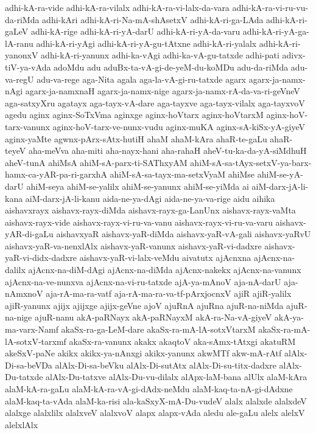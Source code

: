 {adhi-kA-ra-vide
adhi-kA-ra-vilalx
adhi-kA-ra-vi-lalx-da-vara
adhi-kA-ra-vi-ru-vu-da-riMda
adhi-kAri
adhi-kA-ri-Na-mA-shAsetxV
adhi-kA-ri-ga-LAda
adhi-kA-ri-gaLeV
adhi-kA-rige
adhi-kA-ri-yA-darU
adhi-kA-ri-yA-da-varu
adhi-kA-ri-yA-ga-lA-ranu
adhi-kA-ri-yAgi
adhi-kA-ri-yA-gu-tAtxne
adhi-kA-ri-yalalx
adhi-kA-ri-yanonxV
adhi-kA-ri-yanunx
adhi-ka-vAgi
adhi-ka-vA-gu-tatxde
adhi-pati
adivx-tiV-ya-vAda
adoMdu
adu
aduBx-ta-vA-gi-de-yeM-du-koMDu
adu-da-riMda
adu-va-regU
adu-va-rege
aga-Nita
agala
aga-la-vA-gi-ru-tatxde
agarx
agarx-ja-namx-nAgi
agarx-ja-namxnaH
agarx-ja-namx-nige
agarx-ja-namx-rA-da-va-ri-geVneV
aga-satxyXru
agatayx
aga-tayx-vA-dare
aga-tayxve
aga-tayx-vilalx
aga-tayxvoV
agedu
aginx
aginx-SoTxVma
aginxge
aginx-hoVtarx
aginx-hoVtarxM
aginx-hoV-tarx-vanunx
aginx-hoV-tarx-ve-nunx-vudu
aginx-muKA
aginx-sA-kiSx-yA-giyeV
aginx-yaMte
agwnx-pArx-sAtx-hutiH
ahaM
ahaM-kAra
ahaR-te-gaLu
ahaR-teyeV
aha-meVva
aha-miti
aha-nayx-hani
aha-rahaH
aheV-tu-ka-da-yA-siMdhuH
aheV-tunA
ahiMsA
ahiM-sA-parx-ti-SAThxyAM
ahiM-sA-sa-tAyx-setxV-ya-barx-hamx-ca-yAR-pa-ri-garxhA
ahiM-sA-sa-tayx-ma-setxVyaM
ahiMse
ahiM-se-yA-darU
ahiM-seya
ahiM-se-yalilx
ahiM-se-yanunx
ahiM-se-yiMda
ai
aiM-darx-jA-li-kana
aiM-darx-jA-li-kanu
aida-ne-ya-dAgi
aida-ne-ya-va-rige
aidu
aihika
aishavxrayx
aishavx-rayx-diMda
aishavx-rayx-ga-LanUnx
aishavx-rayx-vaMta
aishavx-rayx-vide
aishavx-rayx-vi-ru-va-vanu
aishavx-rayx-vi-ru-va-varu
aishavx-yAR-di-gaLu
aishavxyaR
aishavx-yaR-diMda
aishavx-yaR-vA-gali
aishavx-yaRvU
aishavx-yaR-va-nenxlAlx
aishavx-yaR-vanunx
aishavx-yaR-vi-dadxre
aishavx-yaR-vi-didx-dadxre
aishavx-yaR-vi-lalx-veMdu
aivatutx
ajAcnxna
ajAcnx-na-dalilx
ajAcnx-na-diM-dAgi
ajAcnx-na-diMda
ajAcnx-nakekx
ajAcnx-na-vanunx
ajAcnx-na-ve-nunxva
ajAcnx-na-vi-ru-tatxde
ajA-ya-mAnoV
aja-nA-darU
aja-nAmxnoV
aja-rA-ma-ra-vatf
aja-rA-ma-ra-va-tf-pArxjocnxV
ajiR
ajiR-yalilx
ajiR-yanunx
ajijx
ajijxge
ajijx-geVne
ajoV
ajuRnA
ajuRna
ajuR-na-niMda
ajuR-na-nige
ajuR-nanu
akA-paRNayx
akA-paRNayxM
akA-ra-Na-vA-giyeV
akA-ya-ma-varx-Namf
akaSx-ra-ga-LeM-dare
akaSx-ra-mA-lA-sotxVtarxM
akaSx-ra-mA-lA-sotxV-tarxmf
akaSx-ra-vanunx
akakx
akaqtoV
aka-sAmx-tAtxgi
akatuRM
akeSxV-paNe
akikx
akikx-ya-nAnxgi
akikx-yanunx
akwMTf
akw-mA-rAtf
alAlx-Di-sa-beVDa
alAlx-Di-sa-beVku
alAlx-Di-sutAtx
alAlx-Di-su-titx-dadxre
alAlx-Du-tatxde
alAlx-Du-tatxve
alAlx-Du-vu-dilalx
alApx-laM-bana
alUlx
alaM-kAra
alaM-kA-ra-gaLu
alaM-kA-ra-vA-gi-dAdx-neMdu
alaM-kaq-ta-nA-gi-dAdxne
alaM-kaq-ta-vAda
alaM-ka-risi
ala-kaSxyX-mA-Du-vudeV
alalx
alalxde
alalxdeV
alalxge
alalxlilx
alalxveV
alalxvoV
alapx
alapx-vAda
aledu
ale-gaLu
alelx
alelxV
alelxlAlx
}
